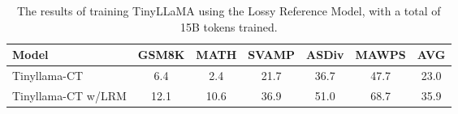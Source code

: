 \begin{table*}[t]
\centering
\small
\caption{The results of training TinyLLaMA using the Lossy Reference Model, with a total of 15B tokens trained.}
\label{tab:lossy_ref_result}
\begin{tabular}{l|ccccc|c}
\toprule
\textbf{Model} & \textbf{GSM8K} & \textbf{MATH} & \textbf{SVAMP} & \textbf{ASDiv} & \textbf{MAWPS} & \textbf{AVG} \\
\midrule
Tinyllama-CT & 6.4 & 2.4 & 21.7 & 36.7 & 47.7 & 23.0 \\
Tinyllama-CT w/LRM  & 12.1 & 10.6 & 36.9 & 51.0 & 68.7 & 35.9 \\
\bottomrule
\end{tabular}
\end{table*}